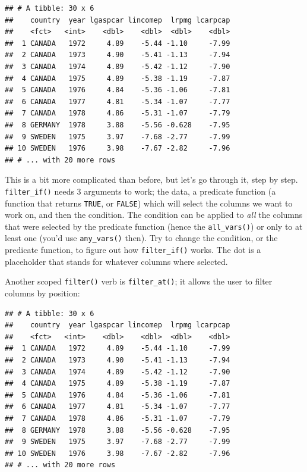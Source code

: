 \documentclass[]{gitbook}
\newenvironment{Shaded}{\begin{snugshade}}{\end{snugshade}}
\newcommand{\DecValTok}[1]{\textcolor[rgb]{0.00,0.00,0.81}{#1}}
\newcommand{\KeywordTok}[1]{\textcolor[rgb]{0.13,0.29,0.53}{\textbf{#1}}}
\newcommand{\NormalTok}[1]{#1}
\newcommand{\OperatorTok}[1]{\textcolor[rgb]{0.81,0.36,0.00}{\textbf{#1}}}
\newcommand{\StringTok}[1]{\textcolor[rgb]{0.31,0.60,0.02}{#1}}
\begin{document}
\begin{verbatim}
## # A tibble: 30 x 6
##    country  year lgaspcar lincomep  lrpmg lcarpcap
##    <fct>   <int>    <dbl>    <dbl>  <dbl>    <dbl>
##  1 CANADA   1972     4.89    -5.44 -1.10     -7.99
##  2 CANADA   1973     4.90    -5.41 -1.13     -7.94
##  3 CANADA   1974     4.89    -5.42 -1.12     -7.90
##  4 CANADA   1975     4.89    -5.38 -1.19     -7.87
##  5 CANADA   1976     4.84    -5.36 -1.06     -7.81
##  6 CANADA   1977     4.81    -5.34 -1.07     -7.77
##  7 CANADA   1978     4.86    -5.31 -1.07     -7.79
##  8 GERMANY  1978     3.88    -5.56 -0.628    -7.95
##  9 SWEDEN   1975     3.97    -7.68 -2.77     -7.99
## 10 SWEDEN   1976     3.98    -7.67 -2.82     -7.96
## # ... with 20 more rows
\end{verbatim}

This is a bit more complicated than before, but let's go through it, step by step.
\texttt{filter\_if()} needs 3 arguments to work; the data, a
predicate function (a function that returns \texttt{TRUE}, or \texttt{FALSE}) which will select the columns we
want to work on, and then the condition. The condition can be applied to \emph{all} the columns that
were selected by the predicate function (hence the \texttt{all\_vars()}) or only to at least one (you'd use
\texttt{any\_vars()} then). Try to change the condition, or the predicate function, to figure out how
\texttt{filter\_if()} works. The dot is a placeholder that stands for whatever columns where selected.

Another scoped \texttt{filter()} verb is \texttt{filter\_at()}; it allows the user to filter columns by position:

\begin{Shaded}
\end{Shaded}

\begin{verbatim}
## # A tibble: 30 x 6
##    country  year lgaspcar lincomep  lrpmg lcarpcap
##    <fct>   <int>    <dbl>    <dbl>  <dbl>    <dbl>
##  1 CANADA   1972     4.89    -5.44 -1.10     -7.99
##  2 CANADA   1973     4.90    -5.41 -1.13     -7.94
##  3 CANADA   1974     4.89    -5.42 -1.12     -7.90
##  4 CANADA   1975     4.89    -5.38 -1.19     -7.87
##  5 CANADA   1976     4.84    -5.36 -1.06     -7.81
##  6 CANADA   1977     4.81    -5.34 -1.07     -7.77
##  7 CANADA   1978     4.86    -5.31 -1.07     -7.79
##  8 GERMANY  1978     3.88    -5.56 -0.628    -7.95
##  9 SWEDEN   1975     3.97    -7.68 -2.77     -7.99
## 10 SWEDEN   1976     3.98    -7.67 -2.82     -7.96
## # ... with 20 more rows
\end{verbatim}
\end{document}
